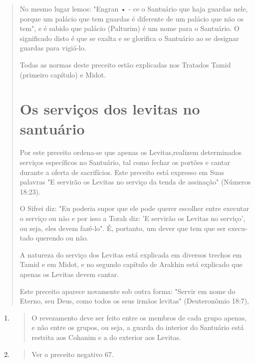 \begin{quote}
No mesmo lugar lemos: "Engran • - ce o Santuário que haja guardas nele,
porque um palácio que tem guardas é diferente de um palácio que não os
tem", e é sabido que palácio (Palturim) é um nome para o Santuário. O
signi­ficado disto é que se exalta e se glorifica o Santuário ao se
designar guardas pa­ra vigiá-lo.

Todas as normas deste preceito estão explicadas nos Tratados Ta­mid
(primeiro capítulo) e Midot.

\section{Os serviços dos levitas no santuário}

Por este preceito ordena-se que apenas os Levitas,realizem determi­nados
serviços específicos no Santuário, tal como fechar os portões e cantar
durante a oferta de sacrifícios. Este preceito está expresso em Suas
palavras "E servirão os Levitas no serviço da tenda de assinação"
(Números 18:23).

O Sifrei diz: "Eu poderia supor que ele pode querer escolher entre
executar o serviço ou não e por isso a Torah diz: 'E servirão os Levitas
no servi­ço', ou seja, eles devem fazê-lo". É, portanto, um dever que
tem que ser execu­tado querendo ou não.

A natureza do serviço dos Levitas está explicada em diversos trechos em
Tamid e em Midot, e no segundo capítulo de Arakhin está explicado que
apenas os Levitas devem cantar.

Este preceito aparece novamente sob outra forma: "Servir em nome do
Eterno, seu Deus, como todos os seus irmãos levitas" (Deuteronômio
18:7),
\end{quote}

\begin{enumerate}
\def\labelenumi{\arabic{enumi}.}
\setcounter{enumi}{47}
\item
 \begin{quote}
 O revezamento deve ser feito entre os membros de cada grupo apenas, e
 não entre os grupos, ou seja, a guarda do interior do Santuário está
 restrita aos Cohanim e a do exterior aos Levitas.
 \end{quote}
\item
 \begin{quote}
 Ver o preceito negativo 67.
 \end{quote}
\end{enumerate}

